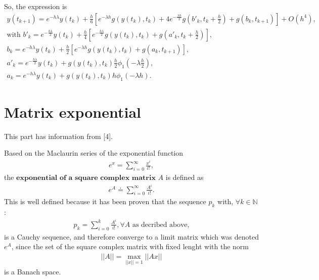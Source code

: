 \documentclass[letterpaper,10pt,english]{jupyterBook}
\begin{document}
\sphinxAtStartPar
So, the expression is
\begin{equation*}
\begin{split}
  y(t_{k+1}) = e^{-h \lambda}y(t_k) + \frac{h}{6} \left[ e^{-\lambda h} g(y(t_k), t_k) + 4 e^{-\frac{ \lambda h}{2}} g\left( b'_{k}, t_k + \frac{h}{2} \right) + g(b_k, t_{k+1}) \right] +  O(h^4), \\
  \text{with } b'_{k} = e^{- \frac{h \lambda}{2}}y(t_k) + \frac{h}{4} \left[ e^{- \frac{h \lambda}{2}} g(y(t_k), t_k) + g \left(a'_{k}, t_k + \frac{h}{2} \right) \right], \\
  b_k = e^{-h \lambda}y(t_k) + \frac{h}{2} \left[ e^{-\lambda h} g(y(t_k), t_k) + g(a_k, t_{k+1}) \right], \\
  a'_{k} = e^{- \frac{h \lambda}{2}} y(t_k) + g(y(t_k), t_k) \frac{h}{2} \phi_1 \left(-\lambda \frac{h}{2} \right), \\
  a_k = e^{-h \lambda}y(t_k) + g(y(t_k), t_k) h \phi_1 (-\lambda h).
\end{split}
\end{equation*}

\section{Matrix exponential}
\label{\detokenize{appendix:matrix-exponential}}
\sphinxAtStartPar
This part has information from {[}4{]}.

\sphinxAtStartPar
Based on the Maclaurin series of the exponential function
\begin{equation*}
\begin{split}
    e^x = \sum_{i=0}^{\infty} \frac{x^i}{i!},
\end{split}
\end{equation*}
\sphinxAtStartPar
the \(\textbf{exponential of a square complex matrix }A\) is defined as
\begin{equation*}
\begin{split}
    e^A \doteq \sum_{i=0}^{\infty} \frac{A^i}{i!}.
\end{split}
\end{equation*}
\sphinxAtStartPar
This is well defined because it has been proven that the sequence \({p_k}\) with, \(\forall k \in \mathbb{N}\):
\begin{equation*}
\begin{split}
    p_k = \sum_{i=0}^{k} \frac{A^i}{i!}, \forall A \text{ as decribed above,}
\end{split}
\end{equation*}
\sphinxAtStartPar
is a Cauchy sequence, and therefore converge to a limit matrix which was denoted \(e^A\), since the set of the square complex matrix with fixed lenght with the norm
\begin{equation*}
\begin{split}
||A|| = \max_{||x||=1} ||Ax||
\end{split}
\end{equation*}
\sphinxAtStartPar
is a Banach space.
\end{document}
